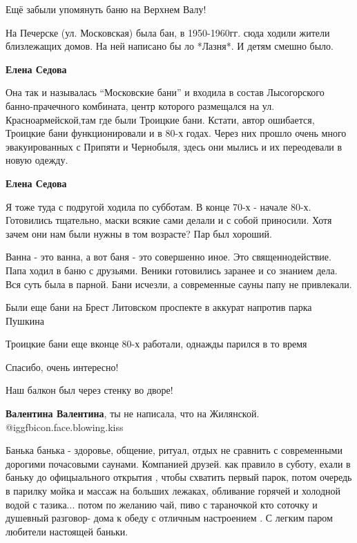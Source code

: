 \begin{itemize}
Ещё забыли упомянуть баню на Верхнем Валу!


На Печерске (ул. Московская) была бан, в 1950-1960гг. сюда ходили жители
близлежащих домов. На ней написано бы ло *Лазня*. И детям смешно было.

\begin{itemize} %
\textbf{Елена Седова}

Она так и называлась \enquote{Московские бани} и входила в состав Лысогорского
банно-прачечного комбината, центр которого размещался на ул.
Красноармейской,там где были Троицкие бани. Кстати, автор ошибается, Троицкие
бани функционировали и в 80-х годах. Через них прошло очень много
эвакуированных с Припяти и Чернобыля, здесь они мылись и их переодевали в новую
одежду.


\textbf{Елена Седова} 

Я тоже туда с подругой ходила по субботам. В конце 70-х - начале 80-х.
Готовились тщательно, маски всякие сами делали и с собой приносили. Хотя зачем
они нам были нужны в том возрасте? Пар был хороший.

\end{itemize} %


Ванна - это ванна, а вот баня - это совершенно иное. Это священнодействие. Папа
ходил в баню с друзьями. Веники готовились заранее и со знанием дела. Вся суть
была в парной. Бани исчезли, а современные сауны папу не привлекали.

Были еще бани на Брест Литовском проспекте в аккурат напротив парка Пушкина

Троицкие бани еще вконце 80-х работали, однажды парился в то время

Спасибо, очень интересно!

Наш балкон был через стенку во дворе!

\begin{itemize} %
\textbf{Валентина Валентина}, ты не написала, что на Жилянской. @igg{fbicon.face.blowing.kiss} 
\end{itemize} %


Банька банька - здоровье, общение, ритуал, отдых не сравнить с современными
дорогими почасовыми саунами. Компанией друзей. как правило в суботу, ехали в
баньку до офицыального открытия , чтобы схватить первый парок, потом очередь в
парилку мойка и массаж на больших лежаках, обливание горячей и холодной водой с
тазика... потом по желанию чай, пиво с тараночкой кто соточку и душевный
разговор- дома к обеду с отличным настроением . С легким паром любители
настоящей баньки.


\end{itemize}
